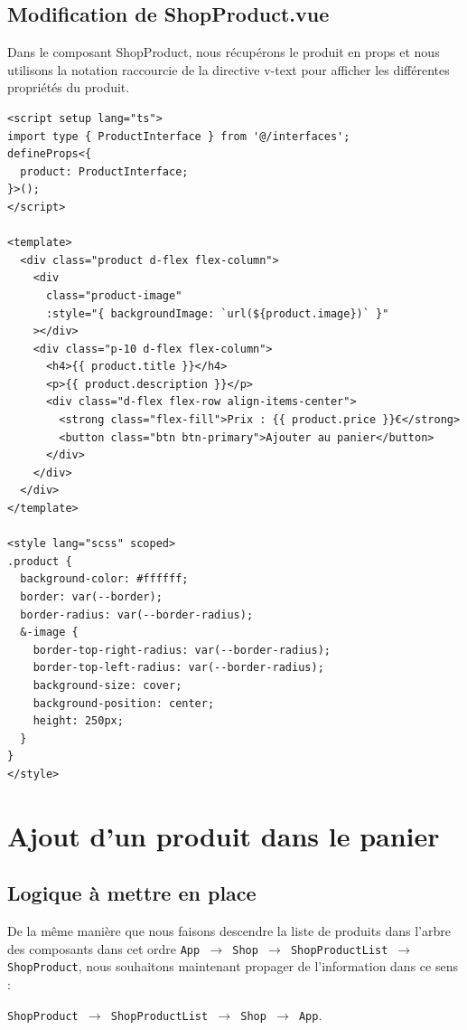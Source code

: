 \documentclass{article}
\begin{document}
\subsection{Modification de {\color{monOrange}ShopProduct.vue}}
Dans le composant {\color{monOrange}ShopProduct}, nous récupérons le produit en {\color{monOrange}props} et nous utilisons la notation raccourcie de la directive {\color{monOrange}v-text} pour afficher les différentes propriétés du produit.
\begin{verbatim}
<script setup lang="ts">
import type { ProductInterface } from '@/interfaces';
defineProps<{
  product: ProductInterface;
}>();
</script>

<template>
  <div class="product d-flex flex-column">
    <div
      class="product-image"
      :style="{ backgroundImage: `url(${product.image})` }"
    ></div>
    <div class="p-10 d-flex flex-column">
      <h4>{{ product.title }}</h4>
      <p>{{ product.description }}</p>
      <div class="d-flex flex-row align-items-center">
        <strong class="flex-fill">Prix : {{ product.price }}€</strong>
        <button class="btn btn-primary">Ajouter au panier</button>
      </div>
    </div>
  </div>
</template>

<style lang="scss" scoped>
.product {
  background-color: #ffffff;
  border: var(--border);
  border-radius: var(--border-radius);
  &-image {
    border-top-right-radius: var(--border-radius);
    border-top-left-radius: var(--border-radius);
    background-size: cover;
    background-position: center;
    height: 250px;
  }
}
</style>
\end{verbatim} 



\section{Ajout d'un produit dans le panier}
\subsection{Logique à mettre en place}
De la même manière que nous faisons descendre la liste de produits dans l'arbre des composants dans cet ordre {\tt App $\to$ Shop $\to$ ShopProductList $\to$ ShopProduct}, nous souhaitons maintenant propager de l'information dans ce sens :
\begin{center}
{\tt  ShopProduct $\to$ ShopProductList $\to$ Shop $\to$ App}.
\end{center}
\end{document}
